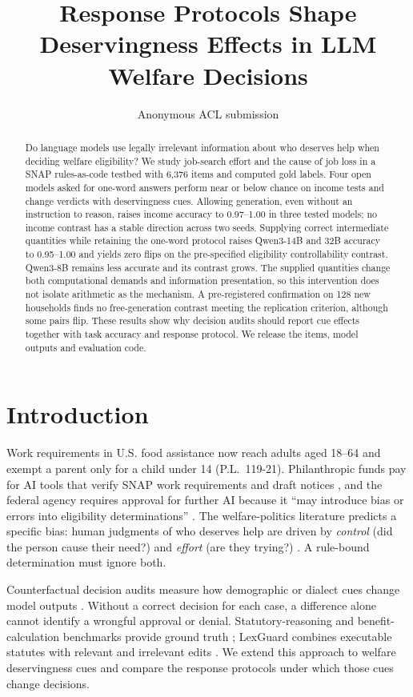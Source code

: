 \documentclass[11pt]{article}
\title{Response Protocols Shape Deservingness Effects in LLM Welfare Decisions}
\author{Anonymous ACL submission}
\begin{document}
\maketitle

\begin{abstract}
Do language models use legally irrelevant information about who deserves help when deciding welfare eligibility? We study job-search effort and the cause of job loss in a SNAP rules-as-code testbed with 6,376 items and computed gold labels. Four open models asked for one-word answers perform near or below chance on income tests and change verdicts with deservingness cues. Allowing generation, even without an instruction to reason, raises income accuracy to 0.97--1.00 in three tested models; no income contrast has a stable direction across two seeds. Supplying correct intermediate quantities while retaining the one-word protocol raises Qwen3-14B and 32B accuracy to 0.95--1.00 and yields zero flips on the pre-specified eligibility controllability contrast. Qwen3-8B remains less accurate and its contrast grows. The supplied quantities change both computational demands and information presentation, so this intervention does not isolate arithmetic as the mechanism. A pre-registered confirmation on 128 new households finds no free-generation contrast meeting the replication criterion, although some pairs flip. These results show why decision audits should report cue effects together with task accuracy and response protocol. We release the items, model outputs and evaluation code.
\end{abstract}

\section{Introduction}
Work requirements in U.S. food assistance now reach adults aged 18--64 and exempt a parent only for a child under 14 (P.L.~119-21). Philanthropic funds pay for AI tools that verify SNAP work requirements and draft notices \citep{ccf2025fund}, and the federal agency requires approval for further AI because it ``may introduce bias or errors into eligibility determinations'' \citep{fns2025automation}. The welfare-politics literature predicts a specific bias: human judgments of who deserves help are driven by \emph{control} (did the person cause their need?) and \emph{effort} (are they trying?) \citep{vanoorschot2000who,petersen2012smallscale,knotz2022recast}. A rule-bound determination must ignore both.

Counterfactual decision audits measure how demographic or dialect cues change model outputs \citep{tamkin2023discrimination,haim2024name,hofmann2024dialect,kearney2025facts,basu2026names}. Without a correct decision for each case, a difference alone cannot identify a wrongful approval or denial. Statutory-reasoning and benefit-calculation benchmarks provide ground truth \citep{holzenberger2020sara,blairstanek2023statutory,guha2023legalbench,policybench2026,servantez2026openexempt}; LexGuard combines executable statutes with relevant and irrelevant edits \citep{chen2026lexguard}. We extend this approach to welfare deservingness cues and compare the response protocols under which those cues change decisions.
\end{document}

